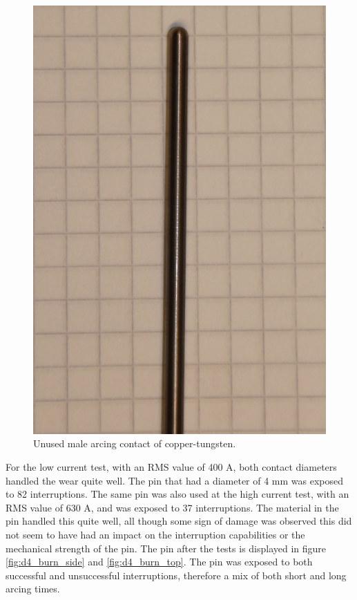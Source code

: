 \documentclass[10pt,a4paper]{article}
\begin{document}
\begin{figure}[H]
\centering
\includegraphics[scale=0.3]{Bilder/Discussion/d3_unused.png}
\caption{Unused male arcing contact of copper-tungsten.} \label{fig:unused_d3}
\end{figure}

For the low current test, with an RMS value of 400 A, both contact diameters handled the wear quite well. The pin that had a diameter of 4 mm was exposed to 82 interruptions. The same pin was also used at the high current test, with an RMS value of 630 A, and was exposed to 37 interruptions. The material in the pin handled this quite well, all though some sign of damage was observed this did not seem to have had an impact on the interruption capabilities or the mechanical strength of the pin. The pin after the tests is displayed in figure \ref{fig:d4_burn_side} and \ref{fig:d4_burn_top}. The pin was exposed to both successful and unsuccessful interruptions, therefore a mix of both short and long arcing times.
\end{document}
